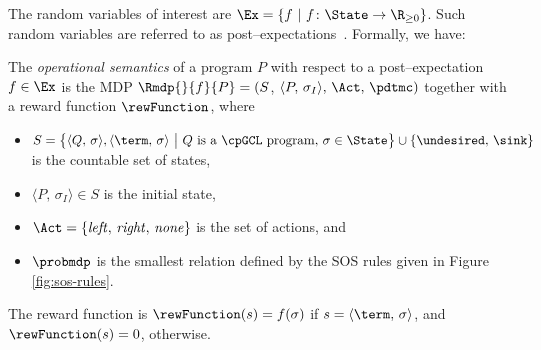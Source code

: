 The random variables of interest are $\Ex = \{f ~|~ f\colon \State \to \R_{\geq 0}\}$.
Such random variables are referred to as post--expectations~\cite{McIver:2004}. 
Formally, we have:
\begin{definition}
The \emph{operational semantics} of a \cpGCL program $P$ with respect to a post--expectation $f \in \Ex$ is the MDP $\Rmdp{}{f}{P} = (S$, $\langle P,\,\sigma_I\rangle,\, \Act,\, \pdtmc)$ together with a reward function $\rewFunction$, where
\begin{itemize}
\item$S = \big\{\langle Q,\, \sigma \rangle,\langle
\term,\, \sigma \rangle ~\big|~ Q \textnormal{ is a \cpGCL program},\, \sigma \in \State\big\} \cup \{\undesired,\, \sink\}$ is the countable set of states,
\item $\langle P,\,\sigma_I\rangle\in S$ is the initial state,
\item $\Act=\{\mathit{left},\,\mathit{right},\, \mathit{none}\}$ is the set of actions, and
\item $\probmdp$ is the smallest relation defined by the SOS rules given in Figure \ref{fig:sos-rules}.
\end{itemize}
The reward function is $\rewFunction(s) = f(\sigma)$ if $s = \langle\term,\, \sigma\rangle$, and $\rewFunction(s) = 0$, otherwise.
\end{definition}
